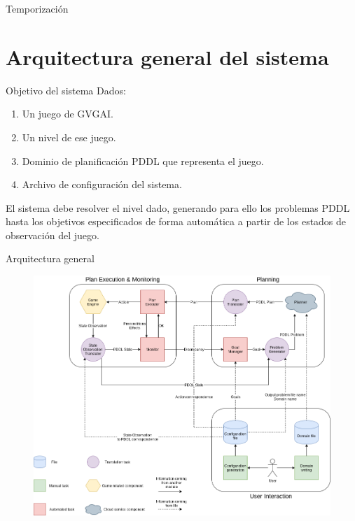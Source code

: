 \documentclass[11pt]{beamer}    %
\begin{document}
    \begin{frame}{Temporización}
        \begin{figure}
            \centering
            \scalebox{0.36}{
                
            }
        \end{figure}
    \end{frame}

    \section{Arquitectura general del sistema}

    \begin{frame}{Objetivo del sistema}
        Dados:

        \begin{enumerate}
            \item Un juego de GVGAI.
            \item Un nivel de ese juego.
            \item Dominio de planificación PDDL que representa el juego.
            \item Archivo de configuración del sistema.
        \end{enumerate}

        El sistema debe resolver el nivel dado, generando para ello los problemas PDDL
        hasta los objetivos especificados \alert{de forma automática} a partir de los estados de
        observación del juego.
    \end{frame}

    \begin{frame}{Arquitectura general}
        \begin{figure}
            \centering
            \includegraphics[scale=0.25]{img/presentation/system_arch}
        \end{figure}
    \end{frame}
\end{document}
